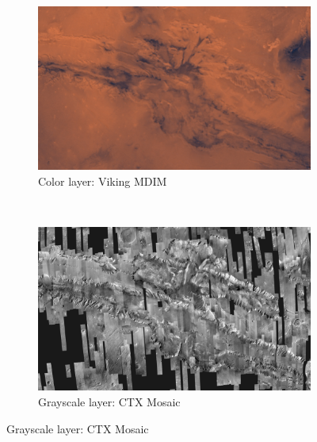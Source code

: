 \begin{figure}[h]
    \centering
    \begin{subfigure}[bt]{0.45\textwidth}
        \includegraphics[width=\textwidth]{figures/results/screenshots_thesis_old/valles_marineris1.jpg}
        \caption{Color layer: Viking MDIM \cite{viking}}
    \end{subfigure}
    ~
    \begin{subfigure}[bt]{0.45\textwidth}
        \includegraphics[width=\textwidth]{figures/results/screenshots_thesis_old/valles_marineris2.jpg}
        \caption{Grayscale layer: CTX Mosaic}
    \end{subfigure}
    

\end{figure}
